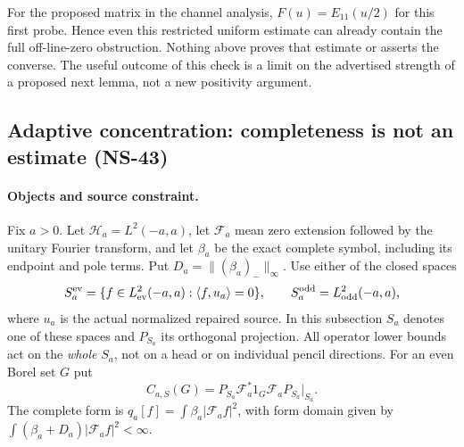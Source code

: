 For the proposed matrix in the channel analysis, $F(u)=E_{11}(u/2)$
for this first probe. Hence even this restricted uniform estimate can
already contain the full off-line-zero obstruction. Nothing above
proves that estimate or asserts the converse. The useful outcome of
this check is a limit on the advertised strength of a proposed next
lemma, not a new positivity argument.


\subsection*{Adaptive concentration: completeness is not an estimate (NS-43)}
\label{ns43-conc-sec}

\paragraph{Objects and source constraint.}
Fix $a>0$. Let $\mathcal H_a=L^2(-a,a)$, let $\mathcal F_a$ mean
zero extension followed by the unitary Fourier transform, and let
$\beta_a$ be the exact complete symbol, including its endpoint and pole
terms. Put $D_a=\| (\beta_a)_-\|_\infty$.
Use either of the closed spaces
\[
 S_a^{\rm ev}=\{f\in L^2_{\rm ev}(-a,a):\langle f,u_a\rangle=0\},
 \qquad S_a^{\rm odd}=L^2_{\rm odd}(-a,a),
\]
where $u_a$ is the actual normalized repaired source.
In this subsection $S_a$ denotes one of these spaces and $P_{S_a}$
its orthogonal projection. All operator lower bounds act on the
\emph{whole} $S_a$, not on a head or on individual pencil directions.
For an even Borel set $G$ put
\[
 C_{a,S}(G)=P_{S_a}\mathcal F_a^*1_G\mathcal F_aP_{S_a}|_{S_a}.
\]
The complete form is
$q_a[f]=\int\beta_a|\mathcal F_af|^2$, with form domain given by
$\int(\beta_a+D_a)|\mathcal F_af|^2<\infty$.

